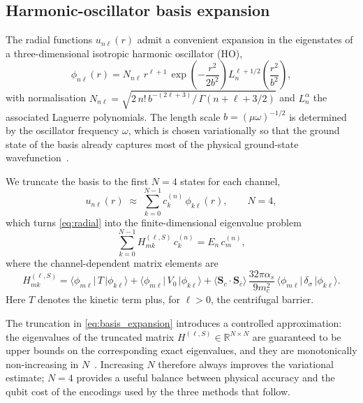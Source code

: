 \subsection{Harmonic-oscillator basis expansion}
\label{ssec:ho_basis}

The radial functions $u_{n\ell}(r)$ admit a convenient expansion in the
eigenstates of a three-dimensional isotropic harmonic oscillator (HO),
\begin{equation}
  \label{eq:ho_states}
  \phi_{n\ell}(r) =
    N_{n\ell}\,r^{\ell+1}\,
    \exp\!\left(-\frac{r^{2}}{2 b^{2}}\right)
    L_{n}^{\ell + 1/2}\!\left(\frac{r^{2}}{b^{2}}\right),
\end{equation}
with normalisation
\(N_{n\ell} = \sqrt{2\,n!\, b^{-(2\ell+3)} /\,\Gamma(n+\ell+3/2)}\)
and $L_n^{\alpha}$ the associated Laguerre polynomials. The length scale
$b = (\mu\omega)^{-1/2}$ is determined by the oscillator frequency $\omega$,
which is chosen variationally so that the ground state of the basis already
captures most of the physical ground-state wavefunction~\cite{gallimore2023}.

We truncate the basis to the first $N=4$ states for each channel,
\begin{equation}
  \label{eq:basis_expansion}
  u_{n\ell}(r) \;\approx\; \sum_{k=0}^{N-1} c_k^{(n)}\,\phi_{k\ell}(r),
  \qquad N = 4,
\end{equation}
which turns \cref{eq:radial} into the finite-dimensional eigenvalue problem
\begin{equation}
  \label{eq:matrix_problem}
  \sum_{k=0}^{N-1} H_{mk}^{(\ell,S)}\,c_k^{(n)} = E_n\,c_m^{(n)},
\end{equation}
where the channel-dependent matrix elements are
\begin{equation}
  \label{eq:matrix_elements}
  H_{mk}^{(\ell,S)} =
    \langle\phi_{m\ell}|\,T\,|\phi_{k\ell}\rangle
    + \langle\phi_{m\ell}|\,V_0\,|\phi_{k\ell}\rangle
    + \langle\mathbf{S}_c\cdot\mathbf{S}_{\bar c}\rangle\,
      \frac{32\pi\alpha_s}{9 m_c^{2}}\,
      \langle\phi_{m\ell}|\,\delta_\sigma\,|\phi_{k\ell}\rangle.
\end{equation}
Here $T$ denotes the kinetic term plus, for $\ell>0$, the centrifugal barrier.

\begin{remark}
The truncation in \cref{eq:basis_expansion} introduces a controlled
approximation: the eigenvalues of the truncated matrix
$H^{(\ell,S)} \in \mathbb{R}^{N\times N}$ are guaranteed to be upper
bounds on the corresponding exact eigenvalues, and they are monotonically
non-increasing in $N$~\cite{macdonald1933}. Increasing $N$ therefore
always improves the variational estimate; $N=4$ provides a useful balance
between physical accuracy and the qubit cost of the encodings used by the
three methods that follow.
\end{remark}

